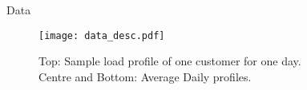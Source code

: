 \documentclass[notes]{beamer}
\begin{document}
\begin{frame}{Data}
\begin{figure}
\centering
\texttt{[image: data\_desc.pdf]}
\caption{Top: Sample load profile of one customer for one day.\\ Centre and Bottom: Average Daily profiles.}
\label{fig:sums} 
\end{figure}
\end{frame}

\end{document}
